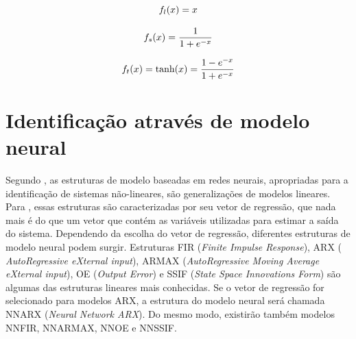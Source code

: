 \begin{equation}
\label{eq:lin}
f_l(x)=x \\
\end{equation} 


\begin{equation}
\label{eq:sig}
f_s(x) = \frac{1}{1+e^{-x}}\\
\end{equation} 


\begin{equation}
\label{eq:tan}
f_t(x) = \text{tanh}(x) = \frac{1-e^{-x}}{1+e^{-x}}\\
\end{equation}


\section{Identificação através de modelo neural}

Segundo , as estruturas de modelo baseadas em redes
neurais, apropriadas para a identificação de sistemas não-lineares, são
generalizações de modelos lineares.  Para , essas
estruturas são caracterizadas por seu vetor de regressão, que nada mais é do que
um vetor que contém as variáveis utilizadas para estimar a saída do sistema.
Dependendo da escolha do vetor de regressão, diferentes estruturas de modelo
neural podem surgir. Estruturas FIR ({\it Finite Impulse Response}), ARX ({\it
AutoRegressive eXternal input}), ARMAX ({\it AutoRegressive Moving Average
eXternal input}), OE ({\it Output Error}) e SSIF ({\it State Space Innovations
Form}) são algumas das estruturas lineares mais conhecidas. Se o vetor de
regressão for selecionado para modelos ARX, a estrutura do modelo neural será
chamada NNARX ({\it Neural Network ARX}). Do mesmo modo, existirão também
modelos NNFIR, NNARMAX, NNOE e NNSSIF.


